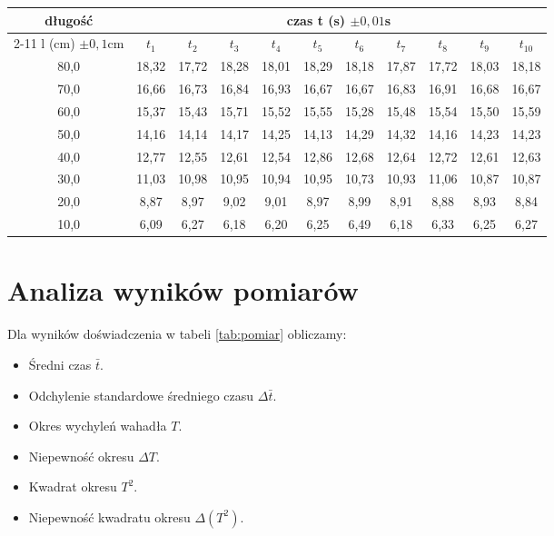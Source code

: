 \documentclass[a4paper,12pt]{article}
\begin{document}
\begin{sidewaystable}[p]
		\centering
		\Large
		\begin{tabular}{|c|c|c|c|c|c|c|c|c|c|c|}
				\hline
	długość             &\multicolumn{10}{c|}{czas t (s) $\pm 0,01$s} \\ \cline{2-11}
	l (cm) $\pm 0,1$cm	& $t_1$ & $t_2$ & $t_3$ & $t_4$ & $t_5$ & $t_6$ & $t_7$ & $t_8$ & $t_9$ & $t_{10}$\\ \hline
		  80,0  & 18,32 & 17,72 & 18,28 & 18,01 & 18,29 & 18,18 & 17,87 & 17,72 & 18,03 & 18,18\\
		  70,0  & 16,66 & 16,73 & 16,84 & 16,93 & 16,67 & 16,67 & 16,83 & 16,91 & 16,68 & 16,67\\
		  60,0  & 15,37 & 15,43 & 15,71 & 15,52 & 15,55 & 15,28 & 15,48 & 15,54 & 15,50 & 15,59\\
		  50,0  & 14,16 & 14,14 & 14,17 & 14,25 & 14,13 & 14,29 & 14,32 & 14,16 & 14,23 & 14,23\\
		  40,0  & 12,77 & 12,55 & 12,61 & 12,54 & 12,86 & 12,68 & 12,64 & 12,72 & 12,61 & 12,63\\
		  30,0  & 11,03 & 10,98 & 10,95 & 10,94 & 10,95 & 10,73 & 10,93 & 11,06 & 10,87 & 10,87\\
		  20,0  & 8,87 & 8,97 & 9,02 & 9,01 & 8,97 & 8,99 & 8,91 & 8,88 & 8,93 & 8,84\\
		  10,0  & 6,09 & 6,27 & 6,18 & 6,20 & 6,25 & 6,49 & 6,18 & 6,33 & 6,25 & 6,27\\\hline
\end{tabular}
		\caption{Tabela wyników pomiarów}
		\label{tab:pomiar}
\end{sidewaystable}

\section{Analiza wyników pomiarów}

Dla wyników doświadczenia w tabeli \ref{tab:pomiar} obliczamy:
\begin{itemize}
		\item Średni czas $\bar{t}$.
		\item Odchylenie standardowe średniego czasu $\Delta \bar{t}$.
		\item Okres wychyleń wahadła $T$.
		\item Niepewność okresu $\Delta T$.
		\item Kwadrat okresu $T^2$.
		\item Niepewność kwadratu okresu $\Delta \left( T^2 \right)$.

\end{itemize}
\end{document}
